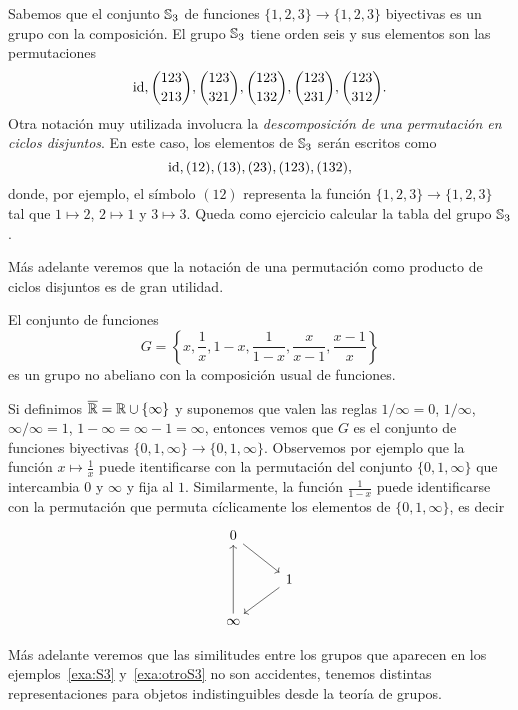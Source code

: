 \begin{example}
\label{exa:S3}
	Sabemos que el conjunto $\mathbb{S}_3$ de funciones $\{1,2,3\}\to\{1,2,3\}$
	biyectivas es un grupo con la composición. El grupo $\mathbb{S}_3$ tiene orden
	seis y sus elementos son las permutaciones
	\[
	\operatorname{id},\binom{123}{213},\binom{123}{321},\binom{123}{132},\binom{123}{231},\binom{123}{312}.
	\]
	Otra notación muy utilizada involucra la \emph{descomposición de una permutación en ciclos disjuntos}. 
	En este caso, los elementos de $\mathbb{S}_3$ serán escritos como 
	\[
		\operatorname{id},(12),(13),(23),(123),(132),
	\]
	donde, por ejemplo, el símbolo $(12)$ representa la
	función $\{1,2,3\}\to\{1,2,3\}$ tal que
	$1\mapsto 2$, $2\mapsto 1$ y $3\mapsto 3$. Queda como ejercicio calcular la tabla del grupo $\mathbb{S}_3$. 
\end{example}

Más adelante veremos que la notación de una permutación como producto de ciclos disjuntos es de gran utilidad. 

\begin{example}
\label{exa:otroS3}
El conjunto
de funciones
\[
G=\left\{x,\frac{1}{x},1-x,\frac{1}{1-x},\frac{x}{x-1},\frac{x-1}{x}\right\}
\]	
es un grupo no abeliano con la composición usual de funciones. 

Si definimos $\overline{\mathbb{R}}=\mathbb{R}\cup\{\infty\}$ y suponemos que valen 
las reglas $1/\infty=0$, $1/\infty$, 
$\infty/\infty=1$, $1-\infty=\infty-1=\infty$, entonces
vemos que $G$ es el conjunto de funciones biyectivas $\{0,1,\infty\}\to\{0,1,\infty\}$. Observemos
por ejemplo que la función $x\mapsto\frac{1}{x}$ puede itentificarse con la permutación del conjunto
$\{0,1,\infty\}$ que intercambia $0$ y $\infty$ y fija al $1$. Similarmente, 
la función $\frac{1}{1-x}$ puede identificarse con la permutación que permuta cíclicamente
los elementos de $\{0,1,\infty\}$, es decir
\[\begin{tikzcd}
	0 \\
	& 1 \\
	\infty
	\arrow[from=1-1, to=2-2]
	\arrow[from=2-2, to=3-1]
	\arrow[from=3-1, to=1-1]
\end{tikzcd}\]
\end{example}

Más adelante veremos que las similitudes entre los grupos que aparecen en 
los ejemplos~\ref{exa:S3} y~\ref{exa:otroS3} no son accidentes, tenemos distintas    
representaciones para objetos indistinguibles desde la teoría de grupos.

